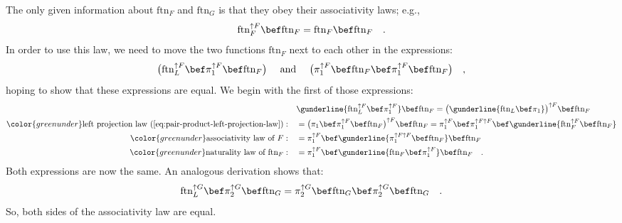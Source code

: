 The only given information about $\text{ftn}_{F}$ and $\text{ftn}_{G}$
is that they obey their associativity laws; e.g.,
\[
\text{ftn}_{F}^{\uparrow F}\bef\text{ftn}_{F}=\text{ftn}_{F}\bef\text{ftn}_{F}\quad.
\]
In order to use this law, we need to move the two functions $\text{ftn}_{F}$
next to each other in the expressions:
\[
\big(\text{ftn}_{L}^{\uparrow F}\bef\pi_{1}^{\uparrow F}\bef\text{ftn}_{F}\big)\quad\text{ and }\quad\big(\pi_{1}^{\uparrow F}\bef\text{ftn}_{F}\bef\pi_{1}^{\uparrow F}\bef\text{ftn}_{F}\big)\quad,
\]
hoping to show that these expressions are equal. We begin with the
first of those expressions:
\begin{align*}
 & \gunderline{\text{ftn}_{L}^{\uparrow F}\bef\pi_{1}^{\uparrow F}}\bef\text{ftn}_{F}=\big(\gunderline{\text{ftn}_{L}\bef\pi_{1}}\big)^{\uparrow F}\bef\text{ftn}_{F}\\
{\color{greenunder}\text{left projection law~(\ref{eq:pair-product-left-projection-law})}:}\quad & =\big(\pi_{1}\bef\pi_{1}^{\uparrow F}\bef\text{ftn}_{F}\big)^{\uparrow F}\bef\text{ftn}_{F}=\pi_{1}^{\uparrow F}\bef\pi_{1}^{\uparrow F\uparrow F}\bef\gunderline{\text{ftn}_{F}^{\uparrow F}\bef\text{ftn}_{F}}\\
{\color{greenunder}\text{associativity law of }F:}\quad & =\pi_{1}^{\uparrow F}\bef\gunderline{\pi_{1}^{\uparrow F\uparrow F}\bef\text{ftn}_{F}}\bef\text{ftn}_{F}\\
{\color{greenunder}\text{naturality law of }\text{ftn}_{F}:}\quad & =\pi_{1}^{\uparrow F}\bef\gunderline{\text{ftn}_{F}\bef\pi_{1}^{\uparrow F}}\bef\text{ftn}_{F}\quad.
\end{align*}
Both expressions are now the same. An analogous derivation shows that:
\[
\text{ftn}_{L}^{\uparrow G}\bef\pi_{2}^{\uparrow G}\bef\text{ftn}_{G}=\pi_{2}^{\uparrow G}\bef\text{ftn}_{G}\bef\pi_{2}^{\uparrow G}\bef\text{ftn}_{G}\quad.
\]
So, both sides of the associativity law are equal.

